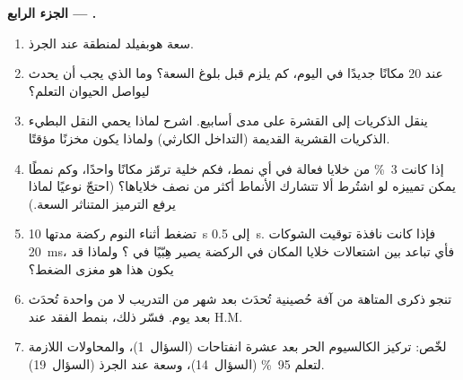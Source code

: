 \begin{problem}
\medskip
\noindent\textbf{الجزء الرابع --- .}
\begin{enumerate}[resume]
  \item سعة هوبفيلد لمنطقة  عند الجرذ.
  \item عند $20$ مكانًا جديدًا في اليوم، كم يلزم قبل بلوغ
        السعة؟ وما الذي يجب أن يحدث ليواصل الحيوان التعلم؟
  \item ينقل  الذكريات إلى القشرة على مدى أسابيع.
        اشرح لماذا يحمي النقل البطيء الذكريات القشرية القديمة
        (التداخل الكارثي) ولماذا يكون  مخزنًا مؤقتًا.
  \item إذا كانت \qty{3}{\%} من خلايا  فعالة في أي نمط، فكم
        خلية ترمّز مكانًا واحدًا، وكم نمطًا يمكن تمييزه لو
        اشتُرط ألا تتشارك الأنماط أكثر من نصف خلاياها؟ (احتجّ
        نوعيًا لماذا يرفع الترميز المتناثر السعة.)
  \item تضغط  أثناء النوم ركضة مدتها \qty{10}{s} إلى
        \qty{0.5}{s}. فإذا كانت نافذة توقيت الشوكات
        \qty{20}{ms}، فأي تباعد بين اشتعالات خلايا المكان في
        الركضة يصير هِبّيًا في ؟ ولماذا قد يكون هذا هو
        مغزى الضغط؟
  \item تنجو ذكرى المتاهة من آفة حُصينية تُحدَث بعد شهر من
        التدريب لا من واحدة تُحدَث بعد يوم. فسّر ذلك، بنمط
        الفقد عند H.M.
  \item لخّص: تركيز الكالسيوم الحر بعد عشرة انفتاحات  (السؤال~1)، والمحاولات اللازمة لتعلم \qty{95}{\%}
        (السؤال~14)، وسعة  عند الجرذ (السؤال~19).
\end{enumerate}
\end{problem}

